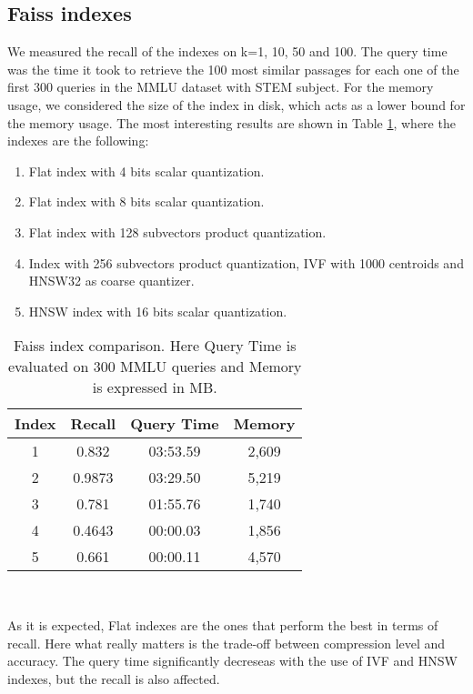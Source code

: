 \documentclass[11pt]{article}
\begin{document}
\subsection{Faiss indexes}

We measured the recall of the indexes on k=1, 10, 50 and 100. The query time was 
the time it took to retrieve the 100 most similar passages for each one of the first 300
queries in the MMLU dataset with STEM subject. 
For the memory usage, we considered the size of the index in disk, which acts as a lower
bound for the memory usage.
The most interesting results are shown in Table \ref{tab:faiss-index}, where the indexes 
are the following:

\begin{enumerate}
    \item Flat index with 4 bits scalar quantization.
    \item Flat index with 8 bits scalar quantization.
    \item Flat index with 128 subvectors product quantization. 
    \item Index with 256 subvectors product quantization, IVF with 1000 centroids
    and HNSW32 as coarse quantizer.
    \item HNSW index with 16 bits scalar quantization.
\end{enumerate}

\begin{table}[h]
\centering
\begin{tabular}{|c|c|c|c|}
\hline
Index & Recall & Query Time & Memory \\
\hline
1 & 0.832 & 03:53.59 & 2,609 \\
2 & 0.9873 & 03:29.50 & 5,219 \\
3 & 0.781 & 01:55.76 & 1,740 \\
4 & 0.4643 & 00:00.03 & 1,856 \\
5 & 0.661 & 00:00.11 & 4,570 \\
\hline
\end{tabular}
\caption{Faiss index comparison.
Here Query Time is evaluated on 300 MMLU queries and Memory is expressed in MB.
}
\
\label{tab:faiss-index}
\end{table}

As it is expected, Flat indexes are the ones that perform the best in terms of recall.
Here what really matters is the trade-off between compression level and accuracy.
The query time significantly decreseas with the use of IVF and HNSW indexes, but the recall
is also affected.
\end{document}
